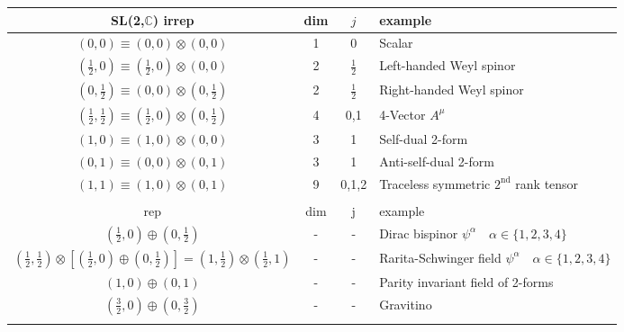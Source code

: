 \documentclass[../main.tex]{subfiles}
\begin{document}
\begin{itemize}
\begin{center}
 \begin{tabular}{c c c l} 
 \hline
 SL(2,$\mathbb{C}$) irrep & dim & $j$ & example \\ [0.5ex] 
 \hline\hline
 $(0,0)\equiv(0,0)\otimes(0,0)$                        & 1 & 0 & Scalar \\  [0.5ex]
 $(\frac{1}{2},0)\equiv(\frac{1}{2},0)\otimes(0,0)$    & 2 & $\frac{1}{2}$ & Left-handed Weyl spinor \\  [0.5ex]
 $(0,\frac{1}{2})\equiv(0,0)\otimes(0,\frac{1}{2})$    & 2 & $\frac{1}{2}$ & Right-handed Weyl spinor \\  [0.5ex]
 $(\frac{1}{2},\frac{1}{2})\equiv(\frac{1}{2},0)\otimes(0,\frac{1}{2})$    & 4 & 0,1 & 4-Vector $A^\mu$ \\  [0.5ex]
 $(1,0)\equiv(1,0)\otimes(0,0)$                        & 3 & 1 & Self-dual 2-form \\  [0.5ex]
 $(0,1)\equiv(0,0)\otimes(0,1)$                        & 3 & 1 & Anti-self-dual 2-form \\  [0.5ex]
 $(1,1)\equiv(1,0)\otimes(0,1)$                        & 9 & 0,1,2 & Traceless symmetric $2^\text{nd}$ rank tensor \\ \hline  \\ [0.5ex]
  \hline
 rep & dim & j & example \\ [0.5ex] 
 \hline\hline
 $(\frac{1}{2},0)\oplus(0,\frac{1}{2})$& - & - & Dirac bispinor $\psi^\alpha\quad \alpha\in\{1,2,3,4\}$ \\  [0.5ex]
 $(\frac{1}{2},\frac{1}{2})\otimes\left[(\frac{1}{2},0)\oplus(0,\frac{1}{2})\right]=(1,\frac{1}{2})\otimes(\frac{1}{2},1)$& - & - & Rarita-Schwinger field $\psi^\alpha\quad \alpha\in\{1,2,3,4\}$ \\  [0.5ex]
  $(1,0)\oplus(0,1)$& - & - & Parity invariant field of 2-forms\\  [0.5ex]
  $(\frac{3}{2},0)\oplus(0,\frac{3}{2})$& - & - & Gravitino \\ \hline \\ [0.5ex]
\end{tabular}
\end{center}

\end{itemize}
\end{document}

